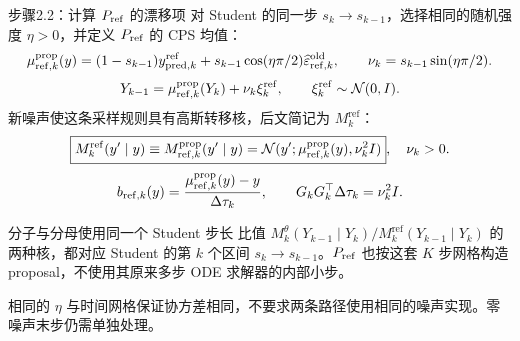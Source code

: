 \documentclass[10pt,aspectratio=169]{beamer}
\newcommand{\N}{\mathcal N}
\newcommand{\sourceline}[1]{\par{\scriptsize\color{gray}#1}\par}
\begin{document}
\begin{frame}{步骤2.2：计算 \ensuremath{P_{\rm ref}} 的漂移项}
\small
对 Student 的同一步 $s_k\to s_{k-1}$，选择相同的随机强度 $\eta>0$，并定义 \ensuremath{P_{\rm ref}} 的 CPS 均值：
\begin{equation}\label{eq:ref-cps-mean}
\mu_{\mathrm{ref},k}^{\rm prop}(y)=(1-s_{k-1})y_{{\rm pred},k}^{\rm ref}
+s_{k-1}\cos(\eta\pi/2)\widehat\varepsilon_{\mathrm{ref},k}^{\rm old},\qquad
\nu_k=s_{k-1}\sin(\eta\pi/2).
\end{equation}
\begin{equation}\label{eq:ref-cps-sample}
Y_{k-1}=\mu_{\mathrm{ref},k}^{\rm prop}(Y_k)+\nu_k\xi_k^\mathrm{ref},
\qquad \xi_k^\mathrm{ref}\sim\N(0,I).
\end{equation}
新噪声使这条采样规则具有高斯转移核，后文简记为 $M_k^\mathrm{ref}$：
\begin{equation}\label{eq:ref-cps-kernel}
\boxed{M_k^\mathrm{ref}(y'\mid y)\equiv M_{\mathrm{ref},k}^{\rm prop}(y'\mid y)
=\N(y';\mu_{\mathrm{ref},k}^{\rm prop}(y),\nu_k^2I)},\quad\nu_k>0.
\end{equation}
\begin{equation}\label{eq:ref-effective-drift}
b_{\mathrm{ref},k}(y)=\frac{\mu_{\mathrm{ref},k}^{\rm prop}(y)-y}{\Delta\tau_k},
\qquad G_kG_k^\top\Delta\tau_k=\nu_k^2I.
\end{equation}
\begin{block}{分子与分母使用同一个 Student 步长}
比值 $M_k^\theta(Y_{k-1}\mid Y_k)/M_k^\mathrm{ref}(Y_{k-1}\mid Y_k)$ 的两种核，都对应 Student 的第 $k$ 个区间 $s_k\to s_{k-1}$。\ensuremath{P_{\rm ref}} 也按这套 $K$ 步网格构造 proposal，不使用其原来多步 ODE 求解器的内部小步。
\end{block}
\sourceline{相同的 $\eta$ 与时间网格保证协方差相同，不要求两条路径使用相同的噪声实现。零噪声末步仍需单独处理。}
\end{frame}
\end{document}
